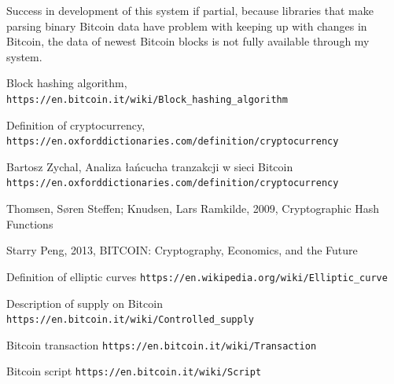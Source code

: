 \documentclass[12pt, en, eng, oneside]{mgr}
\begin{document}
Success in development of this system if partial, because libraries that make parsing binary Bitcoin data have problem with keeping up with changes in Bitcoin, the data of newest Bitcoin blocks is not fully available through my system.    
   

\begin{thebibliography}{9}
 
Block hashing algorithm,
\texttt{https://en.bitcoin.it/wiki/Block\_hashing\_algorithm}

Definition of cryptocurrency,
\texttt{https://en.oxforddictionaries.com/definition/cryptocurrency}

Bartosz Zychal, Analiza łańcucha tranzakcji w sieci Bitcoin
\texttt{https://en.oxforddictionaries.com/definition/cryptocurrency}

Thomsen, Søren Steffen; Knudsen, Lars Ramkilde, 2009, Cryptographic Hash Functions

Starry Peng, 2013, BITCOIN: Cryptography, Economics, and the Future

Definition of elliptic curves
\texttt{https://en.wikipedia.org/wiki/Elliptic\_curve}

Description of supply on Bitcoin
\texttt{https://en.bitcoin.it/wiki/Controlled\_supply}

Bitcoin transaction
\texttt{https://en.bitcoin.it/wiki/Transaction}

Bitcoin script
\texttt{https://en.bitcoin.it/wiki/Script}

\end{thebibliography}
\end{document}
